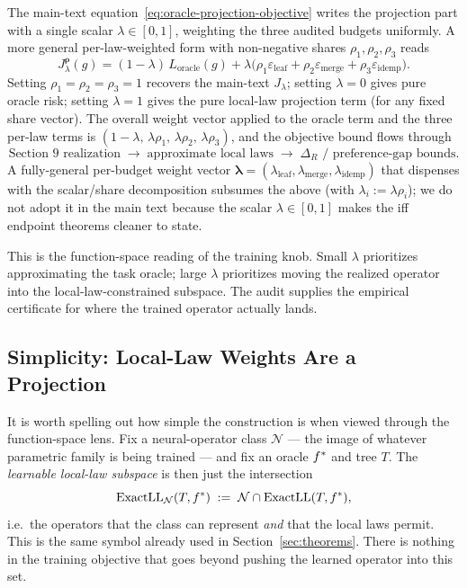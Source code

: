 The main-text equation~\eqref{eq:oracle-projection-objective} writes the
projection part with a single scalar $\lambda\in[0,1]$, weighting the
three audited budgets uniformly. A more general per-law-weighted form
with non-negative shares $\rho_1,\rho_2,\rho_3$ reads
\begin{equation}\label{eq:oracle-projection-objective-generalized}
J_\lambda^{\boldsymbol{\rho}}(g)
  =
  (1-\lambda)\,L_{\mathrm{oracle}}(g)
  +
  \lambda\big(
    \rho_1\varepsilon_{\mathrm{leaf}}
    +\rho_2\varepsilon_{\mathrm{merge}}
    +\rho_3\varepsilon_{\mathrm{idemp}}\big).
\end{equation}
Setting $\rho_1=\rho_2=\rho_3=1$ recovers the main-text
$J_\lambda$; setting $\lambda=0$ gives pure oracle risk; setting
$\lambda=1$ gives the pure local-law projection term (for any fixed
share vector). The overall weight vector applied to the oracle term and
the three per-law terms is
$(1-\lambda,\,\lambda\rho_1,\,\lambda\rho_2,\,\lambda\rho_3)$, and the
objective bound flows through
\[
\text{Section 9 realization}
\;\to\;
\text{approximate local laws}
\;\to\;
\Delta_R \text{ / preference-gap bounds}.
\]
A fully-general per-budget weight vector $\boldsymbol{\lambda}=(\lambda_{\mathrm{leaf}},\lambda_{\mathrm{merge}},\lambda_{\mathrm{idemp}})$
that dispenses with the scalar/share decomposition subsumes the above
(with $\lambda_i := \lambda\rho_i$); we do not adopt it in the main text
because the scalar $\lambda\in[0,1]$ makes the iff endpoint theorems
cleaner to state.

This is the function-space reading of the training knob. Small
$\lambda$ prioritizes approximating the task oracle; large $\lambda$
prioritizes moving the realized operator into the local-law-constrained
subspace. The audit supplies the empirical certificate for where the
trained operator actually lands.

\subsection{Simplicity: Local-Law Weights Are a Projection}\label{app:projection-interpretation}

It is worth spelling out how simple the construction is when viewed
through the function-space lens. Fix a neural-operator class $\mathcal{N}$
--- the image of whatever parametric family is being trained --- and fix
an oracle $f^\ast$ and tree $T$. The \emph{learnable local-law subspace}
is then just the intersection
\[
\mathrm{ExactLL}_{\mathcal{N}}(T,f^\ast)
  \;:=\;
  \mathcal{N}\cap\mathrm{ExactLL}(T,f^\ast),
\]
i.e.\ the operators that the class can represent \emph{and} that the
local laws permit. This is the same symbol already used in
Section~\ref{sec:theorems}. There is nothing in the training objective
that goes beyond pushing the learned operator into this set.

